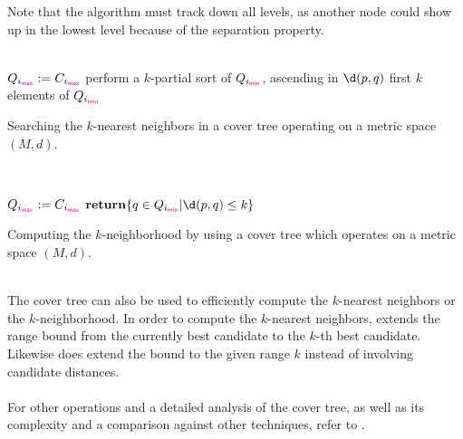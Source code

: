 	Note that the algorithm must track down all levels, as another node could show up in the lowest level because of
	the separation property.\\\\
	\IncMargin{1em}
	\begin{algorithm}
		\BlankLine
		\BlankLine
		$Q_{i_{\textcolor{magenta}{\textsf{max}}}} := C_{i_{\textcolor{magenta}{\textsf{max}}}}$\;
		\BlankLine
		perform a $k$-partial sort of $Q_{i_{\textcolor{magenta}{\textsf{min}}}}$, ascending in $\d(p, q)$\;
		\Return first $k$ elements of $Q_{i_{\textcolor{magenta}{\textsf{min}}}}$\;
		\BlankLine
		\caption{Searching the $k$-nearest neighbors in a cover tree operating on a metric space $(M, d)$.}\label{coverTreeKSearch}
	\end{algorithm}\DecMargin{1em}\quad\\
	\IncMargin{1em}
	\begin{algorithm}
		\BlankLine
		\BlankLine
		$Q_{i_{\textcolor{magenta}{\textsf{max}}}} := C_{i_{\textcolor{magenta}{\textsf{max}}}}$\;
		$\Return \{q \in Q_{i_{\vmin}} | \d(p, q) \le k\}$\;
		\BlankLine
		\caption{Computing the $k$-neighborhood by using a cover tree which operates on a metric space $(M, d)$.}\label{coverTreeKNeighborhood}
	\end{algorithm}\DecMargin{1em}\quad\\
	The cover tree can also be used to efficiently compute the $k$-nearest neighbors or the $k$-neighborhood.
	In order to compute the $k$-nearest neighbors,  extends the range bound from the currently
	best candidate to the $k$-th best candidate. Likewise does  extend the bound to
	the given range $k$ instead of involving candidate distances.\\\\
	For other operations and a detailed analysis of the cover tree, as well as its complexity and a comparison
	against other techniques, refer to .